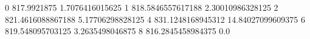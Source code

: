 0 817.9921875 1.7076416015625
1 818.5846557617188 2.30010986328125
2 821.4616088867188 5.17706298828125
4 831.1248168945312 14.84027099609375
6 819.548095703125 3.2635498046875
8 816.2845458984375 0.0
